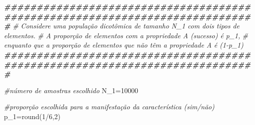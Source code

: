 \documentclass[
]{book}
\newenvironment{Shaded}{\begin{snugshade}}{\end{snugshade}}
\newcommand{\CommentTok}[1]{\textcolor[rgb]{0.56,0.35,0.01}{\textit{#1}}}
\newcommand{\DecValTok}[1]{\textcolor[rgb]{0.00,0.00,0.81}{#1}}
\newcommand{\DocumentationTok}[1]{\textcolor[rgb]{0.56,0.35,0.01}{\textbf{\textit{#1}}}}
\newcommand{\FunctionTok}[1]{\textcolor[rgb]{0.00,0.00,0.00}{#1}}
\newcommand{\NormalTok}[1]{#1}
\newcommand{\OtherTok}[1]{\textcolor[rgb]{0.56,0.35,0.01}{#1}}
\newcommand{\SpecialCharTok}[1]{\textcolor[rgb]{0.00,0.00,0.00}{#1}}
\begin{document}
\hfill\break

\begin{Shaded}
\begin{Highlighting}[]
\DocumentationTok{\#\#\#\#\#\#\#\#\#\#\#\#\#\#\#\#\#\#\#\#\#\#\#\#\#\#\#\#\#\#\#\#\#\#\#\#\#\#\#\#\#\#\#\#\#\#\#\#\#\#\#\#\#\#\#\#\#\#\#\#\#\#\#\#\#\#\#\#\#\#\#\#\#\#\#\#\#}
\CommentTok{\# Considere uma população dicotômica de tamanho N\_1 com dois tipos de elementos.}
\CommentTok{\# A proporção de elementos com a propriedade A (sucesso) é p\_1, }
\CommentTok{\# enquanto que a proporção de elementos que não têm a propriedade A é (1{-}p\_1)}
\DocumentationTok{\#\#\#\#\#\#\#\#\#\#\#\#\#\#\#\#\#\#\#\#\#\#\#\#\#\#\#\#\#\#\#\#\#\#\#\#\#\#\#\#\#\#\#\#\#\#\#\#\#\#\#\#\#\#\#\#\#\#\#\#\#\#\#\#\#\#\#\#\#\#\#\#\#\#\#\#\#}

\CommentTok{\#número de amostras escolhido}
\NormalTok{N\_1}\OtherTok{=}\DecValTok{10000}             

\CommentTok{\#proporção escolhida para a manifestação da característica (sim/não)}
\NormalTok{p\_1}\OtherTok{=}\FunctionTok{round}\NormalTok{(}\DecValTok{1}\SpecialCharTok{/}\DecValTok{6}\NormalTok{,}\DecValTok{2}\NormalTok{)}


\end{Highlighting}
\end{Shaded}
\end{document}
